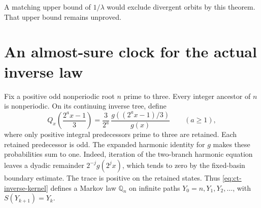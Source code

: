 \documentclass[11pt,a4paper]{article}
\begin{document}
A matching upper bound of \(1/\lambda\) would exclude divergent
orbits by this theorem. That upper bound remains unproved.

\section{An almost-sure clock for the actual inverse law}
\label{sec:ct-inverse-clock}

Fix a positive odd nonperiodic root \(n\) prime to three. Every
integer ancestor of \(n\) is nonperiodic. On its continuing inverse
tree, define
\begin{equation}\label{eq:ct-inverse-kernel}
 Q_x\!\left(\frac{2^a x-1}{3}\right)
   =\frac{3}{2^a}\,
     \frac{g((2^a x-1)/3)}{g(x)}
 \qquad(a\ge1),
\end{equation}
where only positive integral predecessors prime to three are retained.
Each retained predecessor is odd. The expanded harmonic identity for
\(g\) makes these probabilities sum to one. Indeed, iteration of
the two-branch harmonic equation leaves a dyadic remainder
\(2^{-j}g(2^j x)\), which tends to zero by the fixed-basin
boundary estimate. The trace is positive on the retained states.
Thus \eqref{eq:ct-inverse-kernel} defines a Markov law
\(\mathbb Q_n\) on infinite paths \(Y_0=n,Y_1,Y_2,\ldots\),
with \(S(Y_{k+1})=Y_k\).
\end{document}
